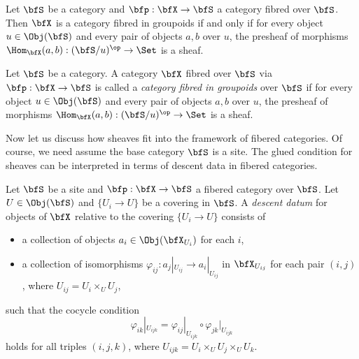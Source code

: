     \begin{proposition}\label{prop:presheaves_of_morphisms_is_sheaf_iff_fibered_category_in_groupoids}
        Let \(\bfS\) be a category and \(\bfp: \bfX \to \bfS\) a category fibred over \(\bfS\).
        Then \(\bfX\) is a category fibred in groupoids if and only if for every object \(u \in \Obj(\bfS)\) and every pair of objects \(a,b\) over \(u\), the presheaf of morphisms \(\Hom_{\bfX}(a,b): (\bfS/u)^{\op} \to \Set\) is a sheaf.
    \end{proposition}

    \begin{definition}\label{def:category_fibered_in_groupoids}
        Let \(\bfS\) be a category.
        A category \(\bfX\) fibred over \(\bfS\) via \(\bfp: \bfX \to \bfS\) is called a \emph{category fibred in groupoids} over \(\bfS\) if for every object \(u \in \Obj(\bfS)\) and every pair of objects \(a,b\) over \(u\), the presheaf of morphisms \(\Hom_{\bfX}(a,b): (\bfS/u)^{\op} \to \Set\) is a sheaf.
    \end{definition}


    Now let us discuss how sheaves fit into the framework of fibered categories.
    Of course, we need assume the base category \(\bfS\) is a site.
    The glued condition for sheaves can be interpreted in terms of descent data in fibered categories.

    \begin{definition}\label{def:descent_data_in_categories}
        Let \(\bfS\) be a site and \(\bfp: \bfX \to \bfS\) a fibered category over \(\bfS\).
        Let \(U \in \Obj(\bfS)\) and \(\{ U_i \to U \}\) be a covering in \(\bfS\).
        A \emph{descent datum} for objects of \(\bfX\) relative to the covering \(\{ U_i \to U \}\) consists of
        \begin{itemize}
            \item a collection of objects \(a_i \in \Obj(\bfX_{U_i})\) for each \(i\),
            \item a collection of isomorphisms \(\varphi_{ij}: a_j|_{U_{ij}} \to a_i|_{U_{ij}}\) in \(\bfX_{U_{ij}}\) for each pair \((i,j)\), where \(U_{ij} = U_i \times_U U_j\),
        \end{itemize}
        such that the cocycle condition
        \[ \varphi_{ik}|_{U_{ijk}} = \varphi_{ij}|_{U_{ijk}} \circ \varphi_{jk}|_{U_{ijk}} \]
        holds for all triples \((i,j,k)\), where \(U_{ijk} = U_i \times_U U_j \times_U U_k\).
    \end{definition}

